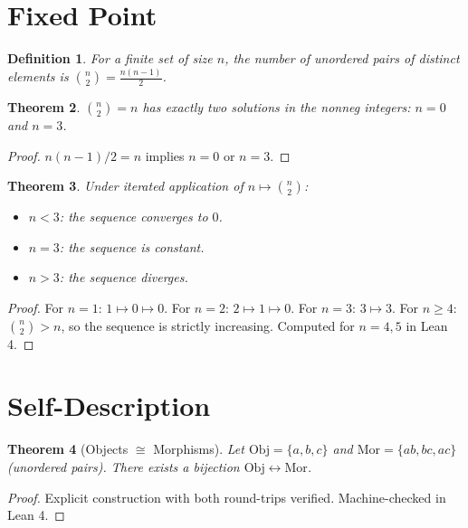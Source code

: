 \documentclass[12pt]{article}
\newtheorem{theorem}{Theorem}
\newtheorem{definition}[theorem]{Definition}
\begin{document}
\section{Fixed Point}

\begin{definition}
For a finite set of size $n$, the number of
unordered pairs of distinct elements is
$\binom{n}{2} = \frac{n(n-1)}{2}$.
\end{definition}

\begin{theorem}
\label{thm:fixed}
$\binom{n}{2} = n$ has exactly two solutions
in the nonneg integers: $n = 0$ and $n = 3$.
\end{theorem}

\begin{proof}
$n(n-1)/2 = n$ implies $n = 0$ or $n = 3$.
\end{proof}

\begin{theorem}
\label{thm:fates}
Under iterated application of $n \mapsto \binom{n}{2}$:
\begin{itemize}
\item $n < 3$: the sequence converges to $0$.
\item $n = 3$: the sequence is constant.
\item $n > 3$: the sequence diverges.
\end{itemize}
\end{theorem}

\begin{proof}
For $n = 1$: $1 \mapsto 0 \mapsto 0$.
For $n = 2$: $2 \mapsto 1 \mapsto 0$.
For $n = 3$: $3 \mapsto 3$.
For $n \geq 4$: $\binom{n}{2} > n$, so the
sequence is strictly increasing.
Computed for $n = 4, 5$ in Lean 4.
\end{proof}

\section{Self-Description}

\begin{theorem}[Objects $\cong$ Morphisms]
\label{thm:obj-mor}
Let $\mathrm{Obj} = \{a, b, c\}$ and
$\mathrm{Mor} = \{ab, bc, ac\}$ (unordered pairs).
There exists a bijection
$\mathrm{Obj} \leftrightarrow \mathrm{Mor}$.
\end{theorem}

\begin{proof}
Explicit construction with both round-trips
verified. Machine-checked in Lean 4.
\end{proof}
\end{document}
